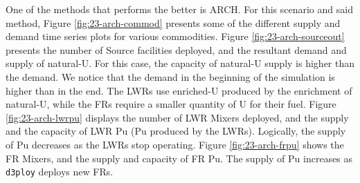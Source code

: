 \documentclass[11pt,letterpaper]{article}
\newcommand{\deploy}{\texttt{d3ploy}\xspace}%
\begin{document}
One of the methods that performs the better is ARCH. For this scenario and said method, Figure \ref{fig:23-arch-commod} presents some of the different supply and demand time series plots for various commodities.
Figure \ref{fig:23-arch-sourceout} presents the number of Source facilities deployed, and the resultant demand and supply of natural-U. For this case, the capacity of natural-U supply is higher than the demand. We notice that the demand in the beginning of the simulation is higher than in the end. The LWRs use enriched-U produced by the enrichment of natural-U, while the FRs require a smaller quantity of U for their fuel. Figure \ref{fig:23-arch-lwrpu} displays the number of LWR Mixers deployed, and the supply and the capacity of LWR Pu (Pu produced by the LWRs). Logically, the supply of Pu decreases as the LWRs stop operating. Figure \ref{fig:23-arch-frpu} shows the FR Mixers, and the supply and capacity of FR Pu. The supply of Pu increases as \deploy deploys new FRs.
\end{document}
